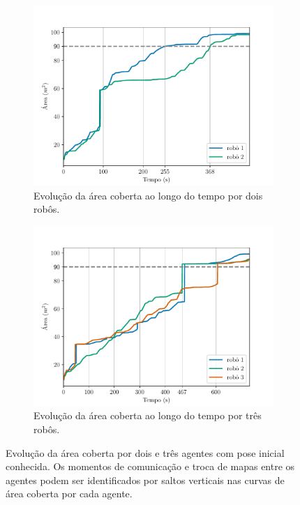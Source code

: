 \begin{figure}
  \centering
  \begin{subfigure}{0.49\textwidth}
    \includegraphics[width=\textwidth]{figs/area_coverage_two_robots-with-known-positions.pdf}
    \caption{Evolução da área coberta ao longo do tempo por dois robôs. 
    }
    \label{}
  \end{subfigure}
  \hfill
  \begin{subfigure}{0.49\textwidth}
    \includegraphics[width=\textwidth]{figs/area_coverage_three_robots-with-known-positions.pdf}
    \caption{Evolução da área coberta ao longo do tempo por três robôs. }
    \label{}
  \end{subfigure}
  \caption{Evolução da área coberta por dois e três agentes com pose inicial conhecida. Os momentos de comunicação e troca de mapas entre os agentes podem ser identificados por saltos verticais nas curvas de área coberta por cada agente.}
  \label{fig:know-initial-pose-area-coverage}
\end{figure}

